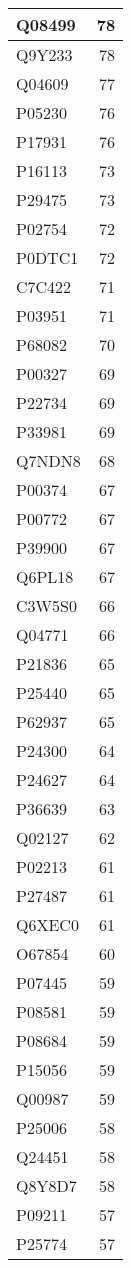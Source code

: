 \documentclass[
]{book}
\theoremstyle{definition}
\theoremstyle{definition}
\theoremstyle{definition}
\theoremstyle{definition}
\theoremstyle{remark}
\begin{document}
\begin{table}
\begin{tabular}{l|r}
\hline
Q08499 & 78\\
\hline
Q9Y233 & 78\\
\hline
Q04609 & 77\\
\hline
P05230 & 76\\
\hline
P17931 & 76\\
\hline
P16113 & 73\\
\hline
P29475 & 73\\
\hline
P02754 & 72\\
\hline
P0DTC1 & 72\\
\hline
C7C422 & 71\\
\hline
P03951 & 71\\
\hline
P68082 & 70\\
\hline
P00327 & 69\\
\hline
P22734 & 69\\
\hline
P33981 & 69\\
\hline
Q7NDN8 & 68\\
\hline
P00374 & 67\\
\hline
P00772 & 67\\
\hline
P39900 & 67\\
\hline
Q6PL18 & 67\\
\hline
C3W5S0 & 66\\
\hline
Q04771 & 66\\
\hline
P21836 & 65\\
\hline
P25440 & 65\\
\hline
P62937 & 65\\
\hline
P24300 & 64\\
\hline
P24627 & 64\\
\hline
P36639 & 63\\
\hline
Q02127 & 62\\
\hline
P02213 & 61\\
\hline
P27487 & 61\\
\hline
Q6XEC0 & 61\\
\hline
O67854 & 60\\
\hline
P07445 & 59\\
\hline
P08581 & 59\\
\hline
P08684 & 59\\
\hline
P15056 & 59\\
\hline
Q00987 & 59\\
\hline
P25006 & 58\\
\hline
Q24451 & 58\\
\hline
Q8Y8D7 & 58\\
\hline
P09211 & 57\\
\hline
P25774 & 57\\

\end{tabular}
\end{table}
\end{document}
